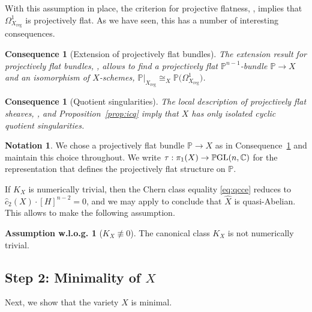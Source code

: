 \documentclass[JEP,XML,SOM,Unicode,published]{cedram}
\theoremstyle{plain}
\newtheorem{consequence}[thm]{Consequence}
\theoremstyle{definition}
\newtheorem{asswlog}[thm]{Assumption w.l.o.g.}
\newtheorem{notation}[thm]{Notation}
\numberwithin{equation}{thm}
\numberwithin{enumi}{thm}
\newcommand{\reg}{\mathrm{reg}}
\DeclareMathOperator{\GL}{GL}
\DeclareMathOperator{\PGL}{\bP\negthinspace\GL}
\newcommand{\bC}{\mathbb{C}}
\newcommand{\bP}{\mathbb{P}}
\let\what\widehat
\begin{document}
With this assumption in place, the criterion for projective flatness,
\cite[Th.\,1.6]{GKP20a}, implies that $\Omega^1_{X_{\reg}}$ is projectively flat. As
we have seen, this has a number of interesting consequences.

\begin{consequence}[Extension of projectively flat bundles]\label{cons:5-3}
The extension result for projectively flat bundles, \cite[Prop.\,3.10]{GKP20a},
allows to find a projectively flat $\bP^{n-1}$-bundle $\bP \to X$ and an isomorphism
of $X$-schemes, $\bP|_{X_{\reg}} \cong_X \bP\big(\Omega^1_{X_{\reg}} \bigr)$.
\end{consequence}

\begin{consequence}[Quotient singularities]\label{consequence:isolated}
The local description of projectively flat sheaves, \cite[Prop.\,3.11]{GKP20a},
and Proposition~\ref{prop:icq} imply that $X$ has only isolated cyclic
quotient singularities.
\end{consequence}

\begin{notation}\label{not:5-5}
We chose a projectively flat bundle $\bP \to X$ as in Consequence~\ref{cons:5-3}
and maintain this choice throughout. We write $\tau: \pi_1(X) \to \PGL(n,\bC)$ for the
representation that defines the projectively flat structure on $\bP$.
\end{notation}

If $K_X$ is numerically trivial, then the Chern class equality \eqref{eq:qcce}
reduces to \hbox{$\what{c}_2(X)\cdot [H]^{n-2} = 0$}, and we may apply
\cite[Th.\,1.2]{LT18} to conclude that $\what{X}$ is quasi-Abelian. This allows
to make the following assumption.

\begin{asswlog}[$K_X \not \equiv 0$]\label{asswlog:knnt}
The canonical class $K_X$ is not numerically trivial.
\end{asswlog}

\subsection*{Step 2: Minimality of $X$}

Next, we show that the variety $X$ is minimal.
\end{document}
